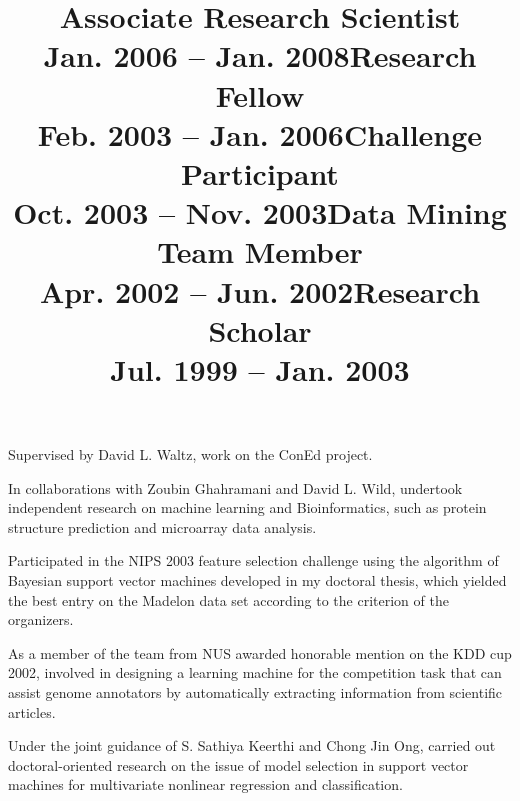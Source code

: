 \documentclass[line,10pt,final]{res}
\begin{document}
\begin{resume}
{\title{\bf Associate Research Scientist \\ \bf Jan. 2006 -- Jan. 2008}
 \location{}
\dates{}
\begin{position}
Supervised by David L. Waltz, work on the ConEd project.
\end{position}

\title{\bf Research Fellow \\ \bf Feb. 2003 -- Jan. 2006} 
 \location{}
\dates{}
\begin{position}
In collaborations with Zoubin Ghahramani and David L. Wild,
undertook independent research on machine learning and
Bioinformatics, such as protein structure prediction and
microarray data analysis.
\end{position}

\title{\bf Challenge Participant\\ \bf Oct. 2003 -- Nov. 2003}
 \location{}
\dates{}
\begin{position}
Participated in the NIPS 2003 feature selection challenge using
the algorithm of Bayesian support vector machines developed in my
doctoral thesis, which yielded the best entry on the Madelon data
set according to the criterion of the organizers.
\end{position}

\title{\bf Data Mining Team Member \\ \bf Apr. 2002 -- Jun. 2002}
 \location{}
\dates{}
\begin{position}
As a member of the team from NUS awarded honorable mention on the
KDD cup 2002, involved in designing a learning machine for the
competition task that can assist genome annotators by
automatically extracting information from scientific articles.
\end{position}

\title{\bf Research Scholar \\ \bf Jul. 1999 -- Jan. 2003}
 \location{}
\dates{}
\begin{position}
Under the joint guidance of S. Sathiya Keerthi and Chong Jin Ong,
carried out doctoral-oriented research on the issue of model
selection in support vector machines for multivariate nonlinear
regression and classification.
\end{position}

}
\end{resume}
\end{document}
